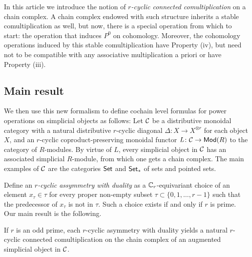 In this article we introduce the notion of \emph{$r$-cyclic connected comultiplication} on a chain complex. A chain complex endowed with such structure inherits a stable comultiplication as well, but now, there is a special operation from which to start: the operation that induces $P^0$ on cohomology. Moreover, the cohomology operations induced by this stable comultiplication have Property (iv), but need not to be compatible with any associative multiplication a priori or have Property (iii). %


\subsection{Main result} We then use this new formalism to define cochain level formulas for power operations on simplicial objects as follows: Let $\mathcal{C}$ be a distributive monoidal category with a natural distributive $r$-cyclic diagonal $\Delta\colon X\to X^{\otimes r}$ for each object $X$, and an $r$-cyclic coproduct-preserving monoidal functor $\operatorname{{\it L}}\colon \mathcal{C}\to \mathsf{Mod}(R)$ to the category of $R$-modules. By virtue of $L$, every simplicial object in $\mathcal{C}$ has an associated simplicial $R$-module, from which one gets a chain complex. The main examples of $\mathcal{C}$ are the categories $\mathsf{Set}$ and $\mathsf{Set}_*$ of sets and pointed sets.

Define an \emph{$r$-cyclic assymmetry with duality} as a $\mathbb{C}_r$-equivariant choice of an element $x_\tau\in \tau$ for every proper non-empty subset $\tau\subset \{0,1,\ldots,r-1\}$ such that the predecessor of $x_\tau$ is not in $\tau$. Such a choice exists if and only if $r$ is prime. Our main result is the following.

\begin{theorem}\label{thm:main}
	If $r$ is an odd prime, each $r$-cyclic asymmetry with duality yields a natural $r$-cyclic connected comultiplication on the chain complex of an augmented simplicial object in $\mathcal{C}$.
\end{theorem}

